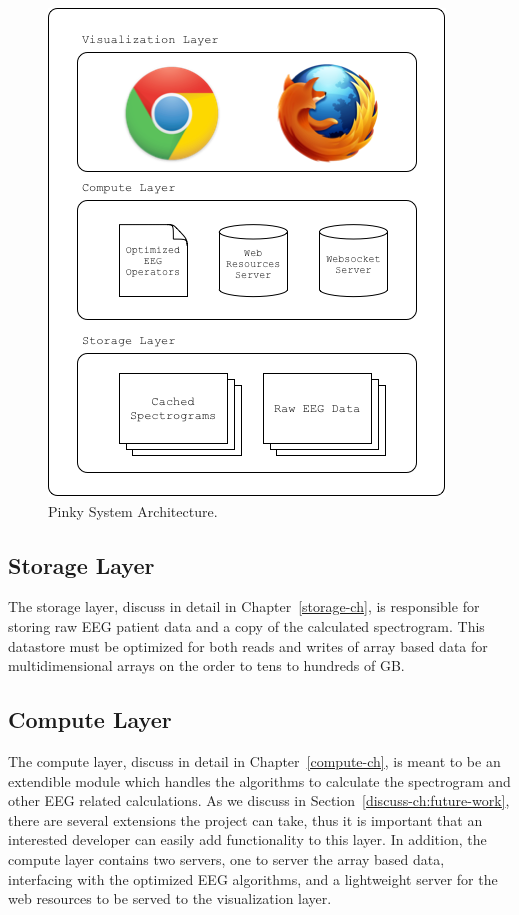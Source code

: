 \begin{figure}[h]
\begin{center}
\includegraphics[scale=0.75]{./img/system-architecture.png}
\caption{Pinky System Architecture.}
\label{fig:system-architecture}
\end{center}
\end{figure}

\subsection{Storage Layer}

The storage layer, discuss in detail in Chapter~\ref{storage-ch}, is
responsible for storing raw EEG patient data and a copy of the calculated
spectrogram. This datastore must be optimized for both reads and writes of
array based data for multidimensional arrays on the order to tens to hundreds
of GB.

\subsection{Compute Layer}

The compute layer, discuss in detail in Chapter~\ref{compute-ch}, is meant to
be an extendible module which handles the algorithms to calculate the
spectrogram and other EEG related calculations. As we discuss in
Section~\ref{discuss-ch:future-work}, there are several extensions the project
can take, thus it is important that an interested developer can easily add
functionality to this layer. In addition, the compute layer contains two
servers, one to server the array based data, interfacing with the optimized EEG
algorithms, and a lightweight server for the web resources to be served to the
visualization layer.

